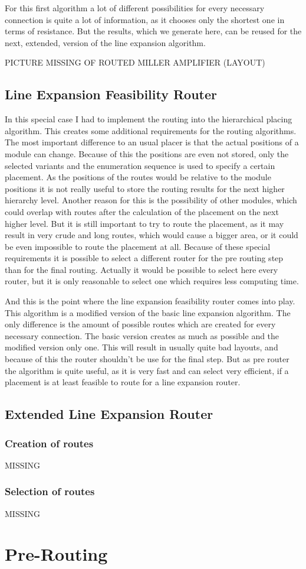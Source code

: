 For this first algorithm a lot of different possibilities for every necessary connection is quite a lot of information, as it chooses only the shortest one in terms of resistance. But the results, which we generate here, can be reused for the next, extended, version of the line expansion algorithm.

PICTURE MISSING OF ROUTED MILLER AMPLIFIER (LAYOUT)

\subsection{Line Expansion Feasibility Router}
In this special case I had to implement the routing into the hierarchical placing algorithm. This creates some additional requirements for the routing algorithms. The most important difference to an usual placer is that the actual positions of a module can change. Because of this the positions are even not stored, only the selected variants and the enumeration sequence is used to specify a certain placement. As the positions of the routes would be relative to the module positions it is not really useful to store the routing results for the next higher hierarchy level. Another reason for this is the possibility of other modules, which could overlap with routes after the calculation of the placement on the next higher level. But it is still important to try to route the placement, as it may result in very crude and long routes, which would cause a bigger area, or it could be even impossible to route the placement at all. Because of these special requirements it is possible to select a different router for the pre routing step than for the final routing. Actually it would be possible to select here every router, but it is only reasonable to select one which requires less computing time.

And this is the point where the line expansion feasibility router comes into play. This algorithm is a modified version of the basic line expansion algorithm. The only difference  is the amount of possible routes which are created for every necessary connection. The basic version creates as much as possible and the modified version only one. This will result in usually quite bad layouts, and because of this the router shouldn't be use for the final step. But as pre router the algorithm is quite useful, as it is very fast and can select very efficient, if a placement is at least feasible to route for a line expansion router.

\subsection{Extended Line Expansion Router}

\subsubsection{Creation of routes}
MISSING

\subsubsection{Selection of routes}
MISSING

\section{Pre-Routing}
